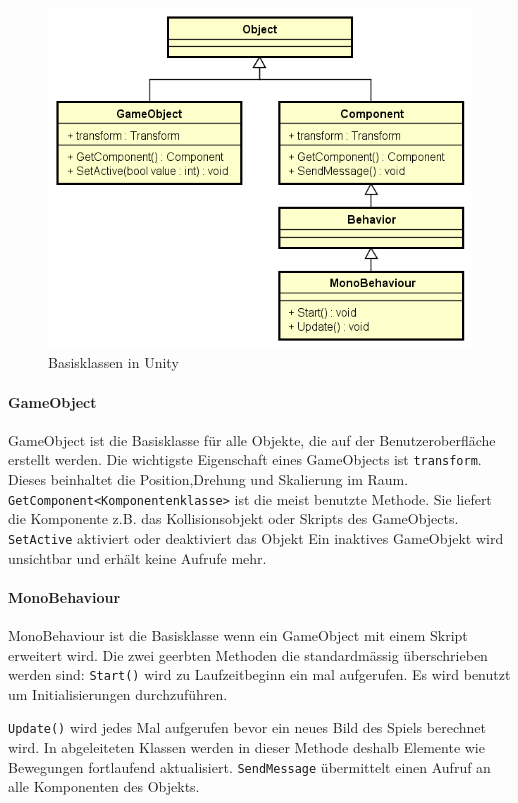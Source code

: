 \begin{figure}[H]
\includegraphics[scale=0.5]{diagramme/unitybaseclasses.png}
\caption{Basisklassen in Unity}
\end{figure}

\paragraph{GameObject}
GameObject ist die Basisklasse für alle Objekte, die auf der Benutzeroberfläche erstellt werden.
Die wichtigste Eigenschaft eines GameObjects ist \lstinline{transform}.
Dieses beinhaltet die Position,Drehung und Skalierung im Raum.
\lstinline{GetComponent<Komponentenklasse>} ist die meist benutzte Methode. 
Sie liefert die Komponente z.B. das Kollisionsobjekt oder Skripts des GameObjects. 
\lstinline{SetActive} aktiviert oder deaktiviert das Objekt
Ein inaktives GameObjekt wird unsichtbar und erhält keine Aufrufe mehr.

\paragraph{MonoBehaviour}

MonoBehaviour ist die Basisklasse wenn ein GameObject mit einem Skript erweitert wird.
Die zwei geerbten Methoden die standardmässig überschrieben werden sind:
\lstinline{Start()} wird zu Laufzeitbeginn ein mal aufgerufen.
Es wird benutzt um Initialisierungen durchzuführen.

\lstinline{Update()} wird jedes Mal aufgerufen bevor ein neues Bild des Spiels berechnet wird. In abgeleiteten Klassen werden in dieser Methode deshalb Elemente wie Bewegungen fortlaufend aktualisiert.
\lstinline{SendMessage} übermittelt einen Aufruf an alle Komponenten des Objekts.

